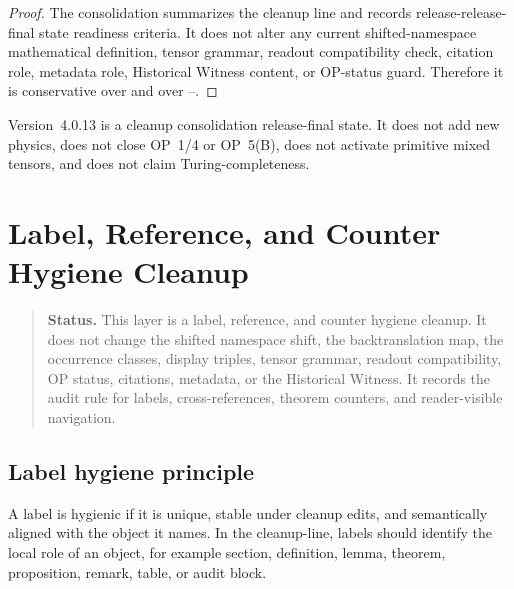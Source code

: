 \begin{proof}
The consolidation summarizes the cleanup line and records release-release-final state
readiness criteria. It does not alter any current shifted-namespace mathematical definition,
tensor grammar, readout compatibility check, citation role, metadata role,
Historical Witness content, or OP-status guard. Therefore it is conservative
over  and over --.
\end{proof}

\begin{remark}
\label{rem:v4010-non-claim}
Version~4.0.13 is a cleanup consolidation release-final state. It does not add new
physics, does not close OP~1/4 or OP~5(B), does not activate primitive mixed
tensors, and does not claim Turing-completeness.
\end{remark}



\clearpage
\section{ Label, Reference, and Counter Hygiene Cleanup}
\label{sec:v4011-label-reference-counter-hygiene-cleanup}

\begin{quote}\small
\noindent\textbf{Status.}
This  layer is a label, reference, and counter hygiene cleanup. It does
not change the shifted namespace shift, the backtranslation map, the occurrence
classes, display triples, tensor grammar, readout compatibility, OP status,
citations, metadata, or the Historical Witness. It records the audit rule for
labels, cross-references, theorem counters, and reader-visible navigation.
\end{quote}

\subsection{Label hygiene principle}
\label{subsec:v4011-label-hygiene-principle}

\begin{definition}
\label{def:v4011-label-hygiene-principle}
A label is hygienic if it is unique, stable under cleanup edits, and
semantically aligned with the object it names. In the cleanup-line,
labels should identify the local role of an object, for example section,
definition, lemma, theorem, proposition, remark, table, or audit block.
\end{definition}


